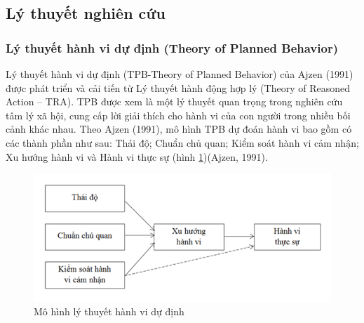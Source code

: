 	\subsection{Lý thuyết nghiên cứu}
		\subsubsection{Lý thuyết hành vi dự định (Theory of Planned Behavior)}
		
		Lý thuyết hành vi dự định (TPB-Theory of Planned Behavior) của Ajzen (1991) được phát triển và cải tiến từ Lý thuyết hành động hợp lý (Theory of Reasoned Action  – TRA). TPB được xem là một lý thuyết quan trọng trong nghiên cứu tâm lý xã hội, cung cấp lời giải thích cho hành vi của con người trong nhiều bối cảnh khác nhau. Theo Ajzen (1991), mô hình TPB dự đoán hành vi bao gồm có các thành phần như sau: Thái độ; Chuẩn chủ quan; Kiểm soát hành vi cảm nhận; Xu hướng hành vi và Hành vi thực sự (hình \ref{mo_hinh_ly_thuyet_hanh_vi_du_dinh})(Ajzen, 1991).
		
		\begin{figure}[H]
			\includegraphics[width=\linewidth]{picture/mo_hinh_ly_thuyet_hanh_vi_du_dinh.png}
			\caption{Mô hình lý thuyết hành vi dự định}
			\label{mo_hinh_ly_thuyet_hanh_vi_du_dinh}
		\end{figure}
		
